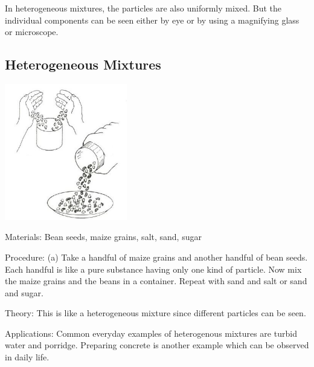\begin{multicols}{2}
\begin{description*}
{In heterogeneous mixtures, the particles are
also uniformly mixed. But the individual
components can be seen either by eye or by
using a magnifying glass or microscope.}
\end{description*}

\subsection{Heterogeneous Mixtures}

\begin{center}
\includegraphics[width=0.4\textwidth]{./img/source/heterogeneous.jpg}
\end{center}

\begin{description*}
\item[Materials:]{Bean seeds, maize grains, salt, sand, sugar}
\item[Procedure:]{(a) Take a handful of maize grains and
another handful of bean seeds. Each handful is
like a pure substance having only one kind of
particle. Now mix the maize grains and the
beans in a container. 
Repeat with sand and salt or sand and sugar.}
\item[Theory:]{This is like a heterogeneous
mixture since different particles can be seen.}
\item[Applications:]{Common everyday examples of
heterogenous mixtures are turbid water and
porridge. Preparing concrete is another example which can be observed in daily life.}
\end{description*}


\end{multicols}
